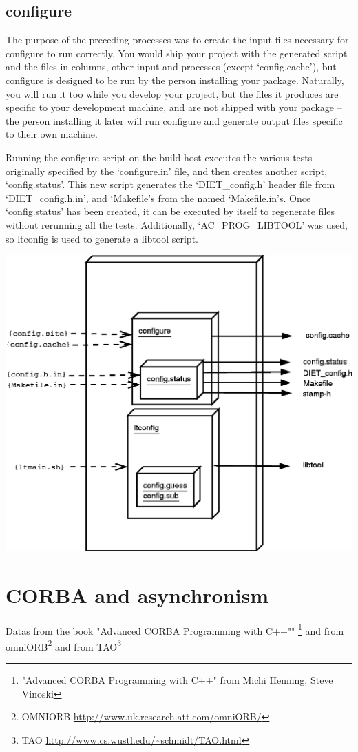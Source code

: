 \subsection{configure}
The purpose of the preceding processes was to create the input files necessary
for configure to run correctly. You would ship your project with the generated
script and the files in columns, other input and processes (except 
`config.cache'), but configure is designed to be run by the person installing
your package. Naturally, you will run it too while you develop your project,
but the files it produces are specific to your development machine, and are
not shipped with your package -- the person installing it later will run 
configure and generate output files specific to their own machine.

Running the configure script on the build host executes the various tests 
originally specified by the `configure.in' file, and then creates another script,
`config.status'. This new script generates the `DIET\_config.h' header file from 
`DIET\_config.h.in', and `Makefile's from the named `Makefile.in's. Once 
`config.status' has been created, it can be executed by itself to regenerate
files without rerunning all the tests. Additionally, `AC\_PROG\_LIBTOOL'
was used, so ltconfig is used to generate a libtool script. 

\begin{center}
\includegraphics[scale=.35]{fig/DiagrammeConfigure}
\end{center}

\section{CORBA and asynchronism}
Datas from the book "Advanced CORBA Programming with C++""
\footnote{"Advanced CORBA Programming with C++"  from Michi Henning, Steve Vinoski} and
from omniORB\footnote{OMNIORB {\url{http://www.uk.research.att.com/omniORB/}}}
and from TAO\footnote{TAO {\url{http://www.cs.wustl.edu/~schmidt/TAO.html}}
}

